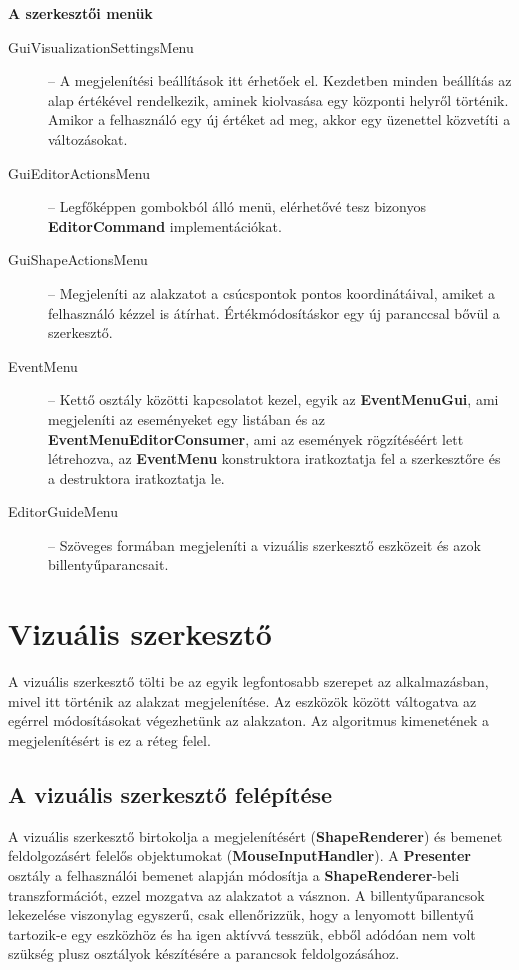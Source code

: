 \textbf{A szerkesztői menük}

\begin{description}
	\item[GuiVisualizationSettingsMenu] -- A megjelenítési beállítások itt érhetőek el. Kezdetben minden beállítás az alap értékével rendelkezik, aminek kiolvasása egy központi helyről történik. Amikor a felhasználó egy új értéket ad meg, akkor egy üzenettel közvetíti a változásokat.
	\item[GuiEditorActionsMenu] -- Legfőképpen gombokból álló menü, elérhetővé tesz bizonyos \textbf{EditorCommand} implementációkat.
	\item[GuiShapeActionsMenu] -- Megjeleníti az alakzatot a csúcspontok pontos koordinátáival, amiket a felhasználó kézzel is átírhat. Értékmódosításkor egy új paranccsal bővül a szerkesztő.
	\item[EventMenu] -- Kettő osztály közötti kapcsolatot kezel, egyik az \textbf{EventMenuGui}, ami megjeleníti az eseményeket egy listában és az \textbf{EventMenuEditorConsumer}, ami az események rögzítéséért lett létrehozva, az \textbf{EventMenu} konstruktora iratkoztatja fel a szerkesztőre és a destruktora iratkoztatja le.
	\item[EditorGuideMenu] -- Szöveges formában megjeleníti a vizuális szerkesztő eszközeit és azok billentyűparancsait.
\end{description}


\section{Vizuális szerkesztő}

A vizuális szerkesztő tölti be az egyik legfontosabb szerepet az alkalmazásban, mivel itt történik az alakzat megjelenítése. Az eszközök között váltogatva az egérrel módosításokat végezhetünk az alakzaton. Az algoritmus kimenetének a megjelenítésért is ez a réteg felel.

\subsection{A vizuális szerkesztő felépítése}

A vizuális szerkesztő birtokolja a megjelenítésért (\textbf{ShapeRenderer}) és bemenet feldolgozásért felelős objektumokat (\textbf{MouseInputHandler}). A \textbf{Presenter} osztály a felhasználói bemenet alapján módosítja a \textbf{ShapeRenderer}-beli transzformációt, ezzel mozgatva az alakzatot a vásznon. A billentyűparancsok lekezelése viszonylag egyszerű, csak ellenőrizzük, hogy a lenyomott billentyű tartozik-e egy eszközhöz és ha igen aktívvá tesszük, ebből adódóan nem volt szükség plusz osztályok készítésére a parancsok feldolgozásához.

